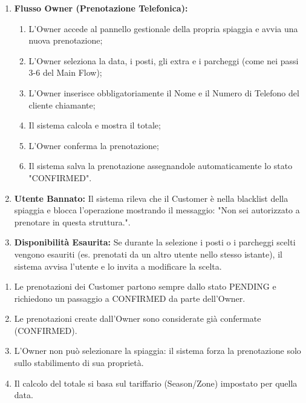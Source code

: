 \documentclass[border=10pt]{standalone}
\begin{document}
	{
		\begin{enumerate}[nosep, leftmargin=33px]
			\item[\textbf{1a.}] \textbf{Flusso Owner (Prenotazione Telefonica):}
			\begin{enumerate}[nosep, leftmargin=*]
				\item[i.] L'Owner accede al pannello gestionale della propria spiaggia e avvia una nuova prenotazione;
				\item[ii.] L'Owner seleziona la data, i posti, gli extra e i parcheggi (come nei passi 3-6 del Main Flow);
				\item[iii.] L'Owner inserisce obbligatoriamente il Nome e il Numero di Telefono del cliente chiamante;
				\item[iv.] Il sistema calcola e mostra il totale;
				\item[v.] L'Owner conferma la prenotazione;
				\item[vi.] Il sistema salva la prenotazione assegnandole automaticamente lo stato "CONFIRMED".
			\end{enumerate}
			\item[\textbf{2a-e.}] \textbf{Utente Bannato:} Il sistema rileva che il Customer è nella blacklist della spiaggia e blocca l'operazione mostrando il messaggio: "Non sei autorizzato a prenotare in questa struttura.".
			\item[\textbf{4/6a-e.}] \textbf{Disponibilità Esaurita:} Se durante la selezione i posti o i parcheggi scelti vengono esauriti (es. prenotati da un altro utente nello stesso istante), il sistema avvisa l'utente e lo invita a modificare la scelta.
		\end{enumerate}
	}
	{
		\begin{enumerate}[nosep, leftmargin=*]
			\item[•] Le prenotazioni dei Customer partono sempre dallo stato PENDING e richiedono un passaggio a CONFIRMED da parte dell'Owner.
			\item[•] Le prenotazioni create dall'Owner sono considerate già confermate (CONFIRMED). 
			\item[•] L'Owner non può selezionare la spiaggia: il sistema forza la prenotazione solo sullo stabilimento di sua proprietà.
			\item[•] Il calcolo del totale si basa sul tariffario (Season/Zone) impostato per quella data.
		\end{enumerate}
	}
\end{document}
